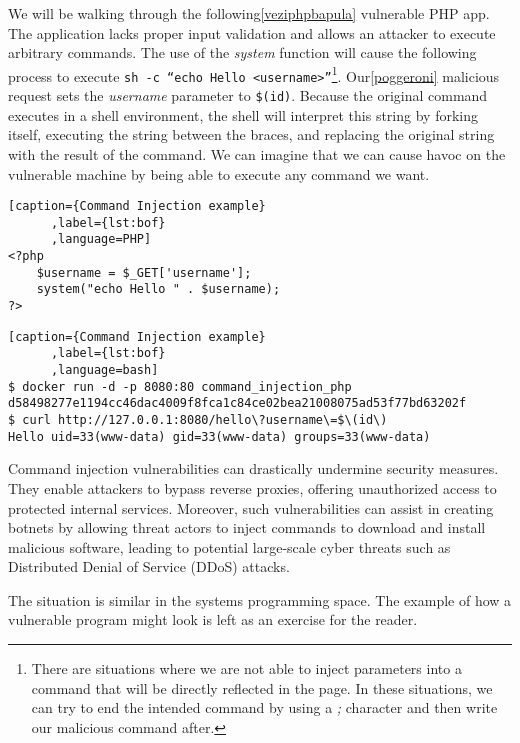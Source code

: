 \documentclass{article}
\begin{document}
We will be walking through the following\ref{veziphpbapula} vulnerable PHP app. The application lacks proper input validation and allows an attacker to execute arbitrary commands. The use of the \emph{system} function will cause the following process to execute \texttt{sh -c ``echo Hello <username>''}\footnote{There are situations where we are not able to inject parameters into a command that will be directly reflected in the page. In these situations, we can try to end the intended command by using a \emph{;} character and then write our malicious command after.}. Our\ref{poggeroni} malicious request sets the \emph{username} parameter to \verb|$(id)|. Because the original command executes in a shell environment, the shell will interpret this string by forking itself, executing the string between the braces, and replacing the original string with the result of the command. We can imagine that we can cause havoc on the vulnerable machine by being able to execute any command we want.

\begin{minipage}{\linewidth}
\begin{lstlisting}[caption={Command Injection example}
      ,label={lst:bof}
      ,language=PHP]
<?php
    $username = $_GET['username'];
    system("echo Hello " . $username);
?>
\end{lstlisting}
\end{minipage}

\begin{lstlisting}[caption={Command Injection example}
      ,label={lst:bof}
      ,language=bash]
$ docker run -d -p 8080:80 command_injection_php
d58498277e1194cc46dac4009f8fca1c84ce02bea21008075ad53f77bd63202f
$ curl http://127.0.0.1:8080/hello\?username\=$\(id\)
Hello uid=33(www-data) gid=33(www-data) groups=33(www-data)
\end{lstlisting}
Command injection vulnerabilities can drastically undermine security measures. They enable attackers to bypass reverse proxies, offering unauthorized access to protected internal services. Moreover, such vulnerabilities can assist in creating botnets by allowing threat actors to inject commands to download and install malicious software, leading to potential large-scale cyber threats such as Distributed Denial of Service (DDoS) attacks.

The situation is similar in the systems programming space. The example of how a vulnerable program might look is left as an exercise for the reader.
\end{document}
